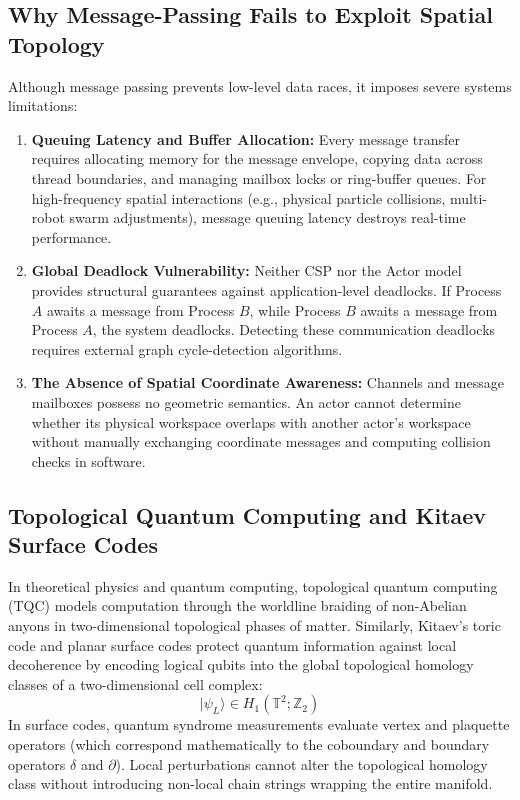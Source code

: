 \subsection{Why Message-Passing Fails to Exploit Spatial Topology}
Although message passing prevents low-level data races, it imposes severe systems limitations:
\begin{enumerate}[leftmargin=1.2cm]
    \item \textbf{Queuing Latency and Buffer Allocation:}  
    Every message transfer requires allocating memory for the message envelope, copying data across thread boundaries, and managing mailbox locks or ring-buffer queues. For high-frequency spatial interactions (e.g., physical particle collisions, multi-robot swarm adjustments), message queuing latency destroys real-time performance.

    \item \textbf{Global Deadlock Vulnerability:}  
    Neither CSP nor the Actor model provides structural guarantees against application-level deadlocks. If Process $A$ awaits a message from Process $B$, while Process $B$ awaits a message from Process $A$, the system deadlocks. Detecting these communication deadlocks requires external graph cycle-detection algorithms.

    \item \textbf{The Absence of Spatial Coordinate Awareness:}  
    Channels and message mailboxes possess no geometric semantics. An actor cannot determine whether its physical workspace overlaps with another actor's workspace without manually exchanging coordinate messages and computing collision checks in software.
\end{enumerate}

\subsection{Topological Quantum Computing and Kitaev Surface Codes}
In theoretical physics and quantum computing, topological quantum computing (TQC) models computation through the worldline braiding of non-Abelian anyons in two-dimensional topological phases of matter. Similarly, Kitaev's toric code and planar surface codes protect quantum information against local decoherence by encoding logical qubits into the global topological homology classes of a two-dimensional cell complex:
\begin{equation}
    |\psi_L\rangle \in H_1(\mathbb{T}^2; \mathbb{Z}_2)
\end{equation}
In surface codes, quantum syndrome measurements evaluate vertex and plaquette operators (which correspond mathematically to the coboundary and boundary operators $\delta$ and $\partial$). Local perturbations cannot alter the topological homology class without introducing non-local chain strings wrapping the entire manifold.

